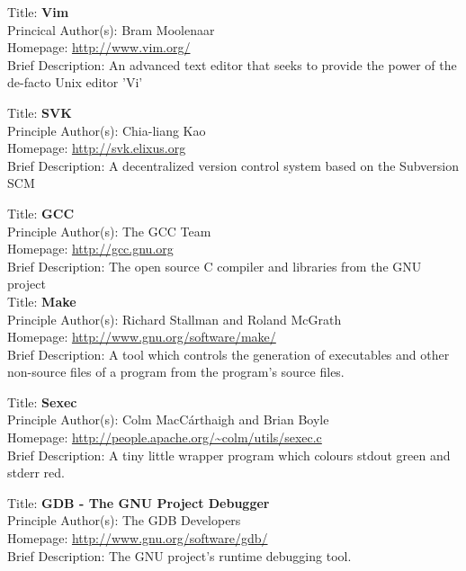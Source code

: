 
Title: 	\textbf{Vim}	\\
Princical Author(s): 	Bram Moolenaar	\\
Homepage: 	\url{http://www.vim.org/}	\\	
Brief Description: 		An advanced text editor that seeks to provide the power of the 
de-facto Unix editor 'Vi'


Title:		\textbf{SVK}	\\
Principle Author(s): 	Chia-liang Kao	\\
Homepage:		\url{http://svk.elixus.org}	\\
Brief Description:		A decentralized version control system based on the Subversion
SCM


Title:		\textbf{GCC}	\\	
Principle Author(s): 	The GCC Team	\\
Homepage:		\url{http://gcc.gnu.org}	\\
Brief Description:		The open source C compiler and libraries from the GNU project \\


Title:		\textbf{Make}	\\
Principle Author(s): 	Richard Stallman and Roland McGrath	\\
Homepage:		\url{http://www.gnu.org/software/make/} \\
Brief Description:		A tool which controls the generation of executables and other
non-source files of a program from the program's source files.


Title: 		\textbf{Sexec}	\\
Principle Author(s): 	Colm MacC\'{a}rthaigh and Brian Boyle	\\
Homepage:		\url{http://people.apache.org/~colm/utils/sexec.c} \\
Brief Description:		A tiny little wrapper program which colours stdout green 
and stderr red.


Title:		\textbf{GDB - The GNU Project Debugger}	\\	
Principle Author(s): 	The GDB Developers	\\
Homepage:		\url{http://www.gnu.org/software/gdb/}	\\
Brief Description: The GNU project's runtime debugging tool. \\


